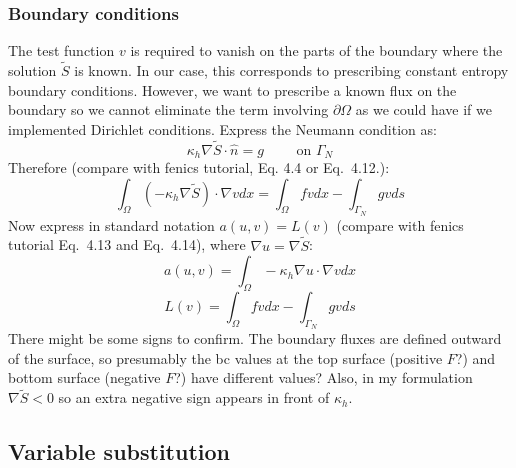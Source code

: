 \subsubsection{Boundary conditions}
The test function $v$ is required to vanish on the parts of the boundary where the solution $\tilde{S}$ is known.  In our case, this corresponds to prescribing constant entropy boundary conditions.  However, we want to prescribe a known flux on the boundary so we cannot eliminate the term involving $\partial \Omega$ as we could have if we implemented Dirichlet conditions.  Express the Neumann condition as:
\begin{equation}
\kappa_h \nabla \tilde{S} \cdot \hat{n} = g \qquad \text{ on } \Gamma_N
\end{equation}
Therefore (compare with fenics tutorial, Eq. 4.4 or Eq.~4.12.):
\begin{equation}
\int_\Omega \left(-\kappa_h \nabla \tilde{S} \right) \cdot \nabla v dx = \int_\Omega f v dx -  \int_{\Gamma_N} g v ds
\end{equation}
Now express in standard notation $a(u,v)=L(v)$ (compare with fenics tutorial Eq.~4.13 and Eq.~4.14), where $\nabla u= \nabla \tilde{S}$:
\begin{equation}
a(u,v) = \int_\Omega -\kappa_h \nabla u \cdot \nabla v dx
\end{equation}
\begin{equation}
L(v) = \int_\Omega f v dx - \int_{\Gamma_N} g v ds
\end{equation}
There might be some signs to confirm.  The boundary fluxes are defined outward of the surface, so presumably the bc values at the top surface (positive $F$?) and bottom surface (negative $F$?) have different values?  Also, in my formulation $\nabla \tilde{S}<0$ so an extra negative sign appears in front of $\kappa_h$.
\subsection{Variable substitution}

\\

